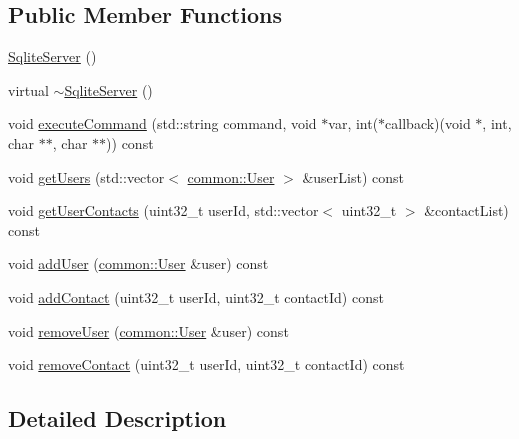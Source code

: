 \subsection*{Public Member Functions}
\begin{DoxyCompactItemize}
\item 
\mbox{\hyperlink{classbabel_1_1server_1_1_sqlite_server_a51ccab47c4de4410853fb212a5a6d5f9}{Sqlite\+Server}} ()
\item 
virtual \mbox{\hyperlink{classbabel_1_1server_1_1_sqlite_server_ac5cb387c4d9cd38a66f259dfc1061702}{$\sim$\+Sqlite\+Server}} ()
\item 
void \mbox{\hyperlink{classbabel_1_1server_1_1_sqlite_server_abb0cc14be5f51826b9165e14ce83e0d0}{execute\+Command}} (std\+::string command, void $\ast$var, int($\ast$callback)(void $\ast$, int, char $\ast$$\ast$, char $\ast$$\ast$)) const
\item 
void \mbox{\hyperlink{classbabel_1_1server_1_1_sqlite_server_ac0e58c4ae276fc3c52b7205a5098a75c}{get\+Users}} (std\+::vector$<$ \mbox{\hyperlink{classbabel_1_1common_1_1_user}{common\+::\+User}} $>$ \&user\+List) const
\item 
void \mbox{\hyperlink{classbabel_1_1server_1_1_sqlite_server_ab00366d846c96ad4521cda421b8a0f31}{get\+User\+Contacts}} (uint32\+\_\+t user\+Id, std\+::vector$<$ uint32\+\_\+t $>$ \&contact\+List) const
\item 
void \mbox{\hyperlink{classbabel_1_1server_1_1_sqlite_server_a699fb4106518510a5105616704eca892}{add\+User}} (\mbox{\hyperlink{classbabel_1_1common_1_1_user}{common\+::\+User}} \&user) const
\item 
void \mbox{\hyperlink{classbabel_1_1server_1_1_sqlite_server_a8d9428a329928080f449eaca7c7d8f80}{add\+Contact}} (uint32\+\_\+t user\+Id, uint32\+\_\+t contact\+Id) const
\item 
void \mbox{\hyperlink{classbabel_1_1server_1_1_sqlite_server_ac7bc85e200004667440927de28502f22}{remove\+User}} (\mbox{\hyperlink{classbabel_1_1common_1_1_user}{common\+::\+User}} \&user) const
\item 
void \mbox{\hyperlink{classbabel_1_1server_1_1_sqlite_server_a526fe31d577c1227af6ed92ee6f65bd6}{remove\+Contact}} (uint32\+\_\+t user\+Id, uint32\+\_\+t contact\+Id) const
\end{DoxyCompactItemize}


\subsection{Detailed Description}


